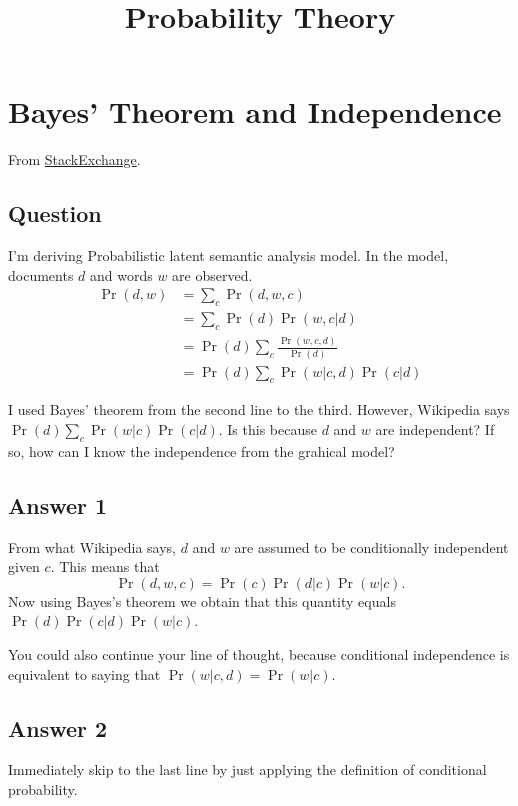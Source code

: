 \documentclass[a4paper,10.5pt]{jsarticle}  %
\begin{document}
\title{Probability Theory}
\author{}
\date{}
\maketitle

\setcounter{tocdepth}{1}
\tableofcontents

\section{Bayes' Theorem and Independence}
From \href{http://math.stackexchange.com/questions/1897874/bayes-theorem-and-independence}{StackExchange}.
\subsection{Question}
I'm deriving Probabilistic latent semantic analysis model. In the model, documents $d$ and words $w$ are observed. 
\begin{align*} \Pr(d,w) &= \sum_{c} \Pr (d,w,c) \\ &= \sum_{c} \Pr(d) \Pr(w,c|d)\\ &= \Pr(d) \sum_{c} \frac{\Pr(w,c,d)}{\Pr(d)} \\ &= \Pr(d) \sum_{c} \Pr(w|c,d) \Pr(c|d)  \end{align*} 

I used Bayes' theorem from the second line to the third. However, Wikipedia says $\Pr(d) \sum_{c} \Pr(w|c) \Pr(c|d)$. Is this because $d$ and $w$ are independent? If so, how can I know the independence from the grahical model?

\subsection{Answer 1}
From what Wikipedia says, $d$ and $w$ are assumed to be conditionally independent given $c$. This means that $$\Pr(d,w,c) = \Pr(c)\Pr(d|c)\Pr(w|c).$$ Now using Bayes's theorem we obtain that this quantity equals $\Pr(d)\Pr(c|d)\Pr(w|c)$.

You could also continue your line of thought, because conditional independence is equivalent to saying that $\Pr(w|c,d) = \Pr(w|c)$.

\subsection{Answer 2}
Immediately skip to the last line by just applying the definition of conditional probability.
\end{document}
